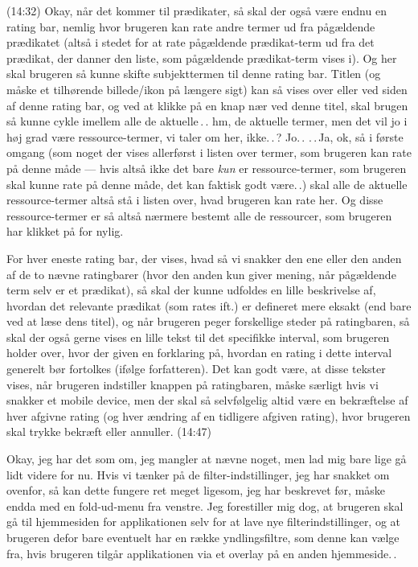 \documentclass{report}
\begin{document}
(14:32) Okay, når det kommer til prædikater, så skal der også være endnu en rating bar, nemlig hvor brugeren kan rate andre termer ud fra pågældende prædikatet (altså i stedet for at rate pågældende prædikat-term ud fra det prædikat, der danner den liste, som pågældende prædikat-term vises i). Og her skal brugeren så kunne skifte subjekttermen til denne rating bar. Titlen (og måske et tilhørende billede/ikon på længere sigt) kan så vises over eller ved siden af denne rating bar, og ved at klikke på en knap nær ved denne titel, skal brugen så kunne cykle imellem alle de aktuelle\,.\,. hm, de aktuelle termer, men det vil jo i høj grad være ressource-termer, vi taler om her, ikke.\,.\,? Jo.\,. .\,.\,Ja, ok, så i første omgang (som noget der vises allerførst i listen over termer, som brugeren kan rate på denne måde --- hvis altså ikke det bare \emph{kun} er ressource-termer, som brugeren skal kunne rate på denne måde, det kan faktisk godt være.\,.) skal alle de aktuelle ressource-termer altså stå i listen over, hvad brugeren kan rate her. Og disse ressource-termer er så altså nærmere bestemt alle de ressourcer, som brugeren har klikket på for nylig. 

For hver eneste rating bar, der vises, hvad så vi snakker den ene eller den anden af de to nævne ratingbarer (hvor den anden kun giver mening, når pågældende term selv er et prædikat), så skal der kunne udfoldes en lille beskrivelse af, hvordan det relevante prædikat (som rates ift.) er defineret mere eksakt (end bare ved at læse dens titel), og når brugeren peger forskellige steder på ratingbaren, så skal der også gerne vises en lille tekst til det specifikke interval, som brugeren holder over, hvor der given en forklaring på, hvordan en rating i dette interval generelt bør fortolkes (ifølge forfatteren). Det kan godt være, at disse tekster vises, når brugeren indstiller knappen på ratingbaren, måske særligt hvis vi snakker et mobile device, men der skal så selvfølgelig altid være en bekræftelse af hver afgivne rating (og hver ændring af en tidligere afgiven rating), hvor brugeren skal trykke bekræft eller annuller. (14:47)

Okay, jeg har det som om, jeg mangler at nævne noget, men lad mig bare lige gå lidt videre for nu. Hvis vi tænker på de filter-indstillinger, jeg har snakket om ovenfor, så kan dette fungere ret meget ligesom, jeg har beskrevet før, måske endda med en fold-ud-menu fra venstre. Jeg forestiller mig dog, at brugeren skal gå til hjemmesiden for applikationen selv for at lave nye filterindstillinger, og at brugeren defor bare eventuelt har en række yndlingsfiltre, som denne kan vælge fra, hvis brugeren tilgår applikationen via et overlay på en anden hjemmeside.\,.
\end{document}
